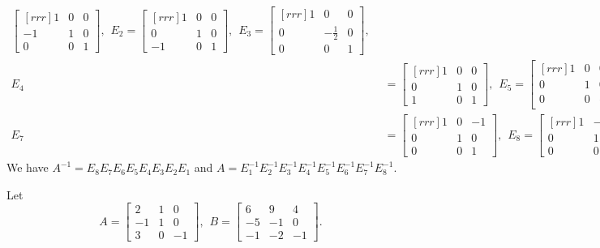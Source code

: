 \begin{solution}
\begin{align*}
\begin{bmatrix}[rrr]
1&0&0\\
-1&1&0\\
0&0&1
\end{bmatrix}, \hspace{5pt}
E_2=\begin{bmatrix}[rrr]
1&0&0\\
0&1&0\\
-1&0&1
\end{bmatrix}, \hspace{5pt}
E_3=\begin{bmatrix}[rrr]
1&0&0\\
0&-\frac{1}{2}&0\\
0&0&1
\end{bmatrix}, \hspace{5pt}
\\
E_4&=\begin{bmatrix}[rrr]
1&0&0\\
0&1&0\\
1&0&1
\end{bmatrix}, \hspace{5pt}
E_5=\begin{bmatrix}[rrr]
1&0&0\\
0&1&0\\
0&0&-\frac{2}{3}
\end{bmatrix}, \hspace{5pt}
E_6=\begin{bmatrix}[rrr]
1&0&0\\
0&1&-\frac{1}{2}\\
0&0&1
\end{bmatrix}, \hspace{5pt}
\\
E_7&=\begin{bmatrix}[rrr]
1&0&-1\\
0&1&0\\
0&0&1
\end{bmatrix}, \hspace{5pt}
E_8=\begin{bmatrix}[rrr]
1&-1&0\\
0&1&0\\
0&0&1
\end{bmatrix}, \hspace{5pt}
\end{align*}
We have $A^{-1}=E_8E_7E_6E_5E_4E_3E_2E_1$ and $A=E_1^{-1}E_2^{-1}E_3^{-1}E_4^{-1}E_5^{-1}E_6^{-1}E_7^{-1}E_8^{-1}$.
\end{solution}
\ii Let 
\[
A=\begin{bmatrix}
2&1&0\\
-1&1&0\\
3&0&-1
\end{bmatrix}, \hspace{5pt}
B=\begin{bmatrix} 
6&9&4\\
-5&-1&0\\
-1&-2&-1
\end{bmatrix}.
\]
